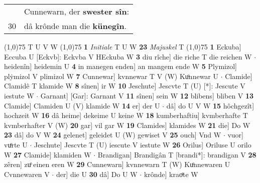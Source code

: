 \documentclass[8pt,a4paper,notitlepage]{article}
\begin{document}
\begin{table}[ht]
\begin{minipage}[t]{0.5\linewidth}
\begin{tabular}{rl}
 & Cunnewarn, der \textbf{swester sîn}:\\ 
30 & dâ krônde man die \textbf{künegîn}.\\ 
\end{tabular}
\scriptsize
\line(1,0){75} \newline
T U V W \newline
\line(1,0){75} \newline
\textbf{1} \textit{Initiale} T U W  \textbf{23} \textit{Majuskel} T  \newline
\line(1,0){75} \newline
\textbf{1} Eckuba] Eccuba U [Eckvb]: Eckvba V HEckuba W \textbf{3} diu rîche] die riche T die reichen W  $\cdot$ heidenîn] heidemin U \textbf{4} in manegen enden] an mangem ende W \textbf{5} Plymizol] plẏmizol V plimizol W \textbf{7} Cunnewar] kvnnewar T V (W) Kuͦnnewar U  $\cdot$ Clamide] Clamidê T klamide W \textbf{8} sînen] ir W \textbf{10} Jeschute] Jescvte T (U) [*]: Jescute  V iestute W  $\cdot$ Garnant] [Gar]: Garnant V \textbf{11} sînen] sein W \textbf{12} blibens] bliben V \textbf{13} Clamide] Clamiden U (V) klamide W \textbf{14} er] der U  $\cdot$ dâ] do U V W \textbf{15} hôchgezît] hochzeit W \textbf{16} dâ heime] dekeime U keine W \textbf{18} kumberhaftiu] kvmberhafte T kvmberhafter V (W) \textbf{20} gar] vil gar W \textbf{19} Clamides] klamides W \textbf{21} die] Do W \textbf{23} dâ] do V W \textbf{24} gelenet] geleidet U (W) gewiset V \textbf{25} ouch] Vnd W  $\cdot$ vuor] vuͦrte U  $\cdot$ Jeschute] Jescvte T (U) iescute V iestute W \textbf{26} Orilus] Oriluse U orilo W \textbf{27} Clamide] klamiden W  $\cdot$ Brandigan] Brandigân T [brandi*]: brandigan V \textbf{28} zêren] zuͦ einen eren W \textbf{29} Cunnewarn] kvnnewarn T (W) Kuͦnnewaren U Cvnnewaren V  $\cdot$ der] die U \textbf{30} dâ] Do U W  $\cdot$ krônde] kraoͤte W \newline
\end{minipage}
\end{table}
\end{document}
